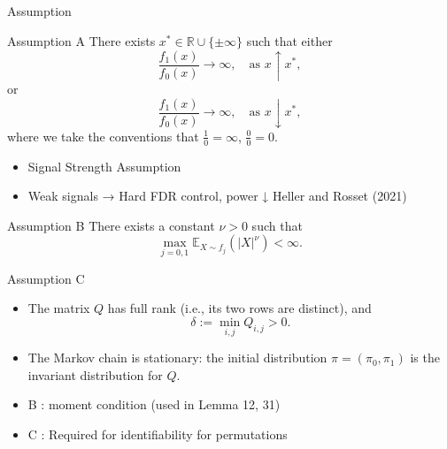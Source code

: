 \documentclass[10pt, aspectratio=169]{beamer}
\begin{document}
\begin{frame}{Assumption}
    \begin{assumpbox}{Assumption A}
        There exists \( x^* \in \mathbb{R} \cup \{\pm\infty\} \) such that either
        \[
        \frac{f_1(x)}{f_0(x)} \to \infty, \quad \text{as } x \uparrow x^*,
        \]
        or
        \[
        \frac{f_1(x)}{f_0(x)} \to \infty, \quad \text{as } x \downarrow x^*,
        \]
        where we take the conventions that \( \frac{1}{0} = \infty \), \( \frac{0}{0} = 0 \).
    \end{assumpbox}
    \begin{itemize}[label=\scalebox{0.5}{$\blacksquare$}]
        \item Signal Strength Assumption
        \item Weak signals → Hard FDR control, power ↓ Heller and Rosset (2021)
    \end{itemize}
\end{frame}
\begin{frame}
    \begin{assumpbox}{Assumption B}
        There exists a constant \( \nu > 0 \) such that
        \begin{equation*}
            \max_{j=0,1} \mathbb{E}_{X \sim f_j} (|X|^\nu) < \infty.
        \end{equation*}
    \end{assumpbox}
     \begin{assumpbox}{Assumption C}
        \begin{itemize}
            \item The matrix \( Q \) has full rank (i.e., its two rows are distinct), and 
            \[
            \delta := \min_{i,j} Q_{i,j} > 0.
            \]
            \item The Markov chain is stationary: the initial distribution \( \pi = (\pi_0, \pi_1) \) is the invariant distribution for \( Q \).
        \end{itemize}
    \end{assumpbox}
    \begin{itemize}[label=\scalebox{0.5}{$\blacksquare$}]
        \item B : moment condition (used in Lemma 12, 31)
        \item C : Required for identifiability for permutations
    \end{itemize}
\end{frame}
\end{document}
